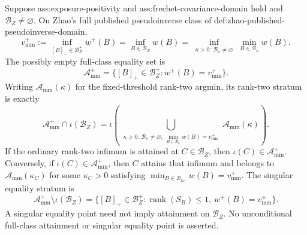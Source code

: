 Suppose ass:exposure-positivity and ass:frechet-covariance-domain hold and \(\mathcal B_Z\ne\varnothing\).  On Zhao's full published pseudoinverse class of def:zhao-published-pseudoinverse-domain,
\[
v_{\mathrm{mm}}^+
:=\inf_{[B]_+\in\mathcal B_Z^+}w^+(B)
=\inf_{B\in\mathcal B_Z}w(B)
=\inf_{\substack{\kappa>0:\,\mathcal B_\kappa\ne\varnothing}}
\min_{B\in\mathcal B_\kappa}w(B).
\]
The possibly empty full-class equality set is
\[
\mathcal A_{\mathrm{mm}}^+
=\{[B]_+\in\mathcal B_Z^+:w^+(B)=v_{\mathrm{mm}}^+\}.
\]
Writing \(\mathcal A_{\mathrm{mm}}(\kappa)\) for the fixed-threshold rank-two argmin, its rank-two stratum is exactly
\[
\mathcal A_{\mathrm{mm}}^+\cap\iota(\mathcal B_Z)
=\iota\!\left(
\bigcup_{\substack{\kappa>0:\,
\mathcal B_\kappa\ne\varnothing,\ 
\min_{B\in\mathcal B_\kappa}w(B)=v_{\mathrm{mm}}^+}}
\mathcal A_{\mathrm{mm}}(\kappa)\right).
\]
If the ordinary rank-two infimum is attained at \(C\in\mathcal B_Z\), then \(\iota(C)\in\mathcal A_{\mathrm{mm}}^+\).  Conversely, if \(\iota(C)\in\mathcal A_{\mathrm{mm}}^+\), then \(C\) attains that infimum and belongs to \(\mathcal A_{\mathrm{mm}}(\kappa_C)\) for some \(\kappa_C>0\) satisfying \(\min_{B\in\mathcal B_{\kappa_C}}w(B)=v_{\mathrm{mm}}^+\).  The singular equality stratum is
\[
\mathcal A_{\mathrm{mm}}^+\setminus\iota(\mathcal B_Z)
=\{[B]_+\in\mathcal B_Z^+:\operatorname{rank}(S_B)\le1,\ w^+(B)=v_{\mathrm{mm}}^+\}.
\]
A singular equality point need not imply attainment on \(\mathcal B_Z\).  No unconditional full-class attainment or singular equality point is asserted.